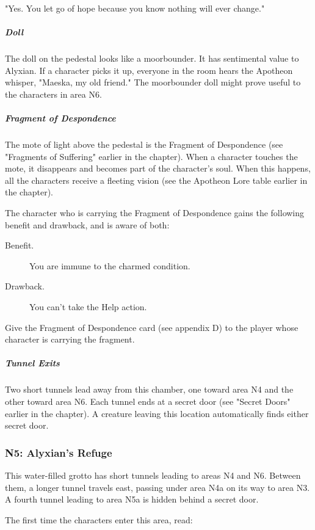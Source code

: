 \documentclass[10pt,a4paper,twoside,fancy,bg=print,twocolumn,openany,nodeprecatedcode]{dndbook}
\begin{document}
\begin{DndReadAloud}{}
"Yes. You let go of hope because you know nothing will ever change."

\end{DndReadAloud}

\subparagraph{Doll}
The doll on the pedestal looks like a moorbounder. It has sentimental value to Alyxian. If a character picks it up, everyone in the room hears the Apotheon whisper, "Maeska, my old friend." The moorbounder doll might prove useful to the characters in area N6.

\subparagraph{Fragment of Despondence}
The mote of light above the pedestal is the Fragment of Despondence (see "Fragments of Suffering" earlier in the chapter). When a character touches the mote, it disappears and becomes part of the character's soul. When this happens, all the characters receive a fleeting vision (see the Apotheon Lore table earlier in the chapter).

The character who is carrying the Fragment of Despondence gains the following benefit and drawback, and is aware of both:



\begin{description}
\item[Benefit.]
You are immune to the charmed condition.
\item[Drawback.]
You can't take the Help action.
\end{description}



Give the Fragment of Despondence card (see appendix D) to the player whose character is carrying the fragment.

\subparagraph{Tunnel Exits}
Two short tunnels lead away from this chamber, one toward area N4 and the other toward area N6. Each tunnel ends at a secret door (see "Secret Doors" earlier in the chapter). A creature leaving this location automatically finds either secret door.

\subsubsection{N5: Alyxian's Refuge}
This water-filled grotto has short tunnels leading to areas N4 and N6. Between them, a longer tunnel travels east, passing under area N4a on its way to area N3. A fourth tunnel leading to area N5a is hidden behind a secret door.

The first time the characters enter this area, read:
\end{document}
